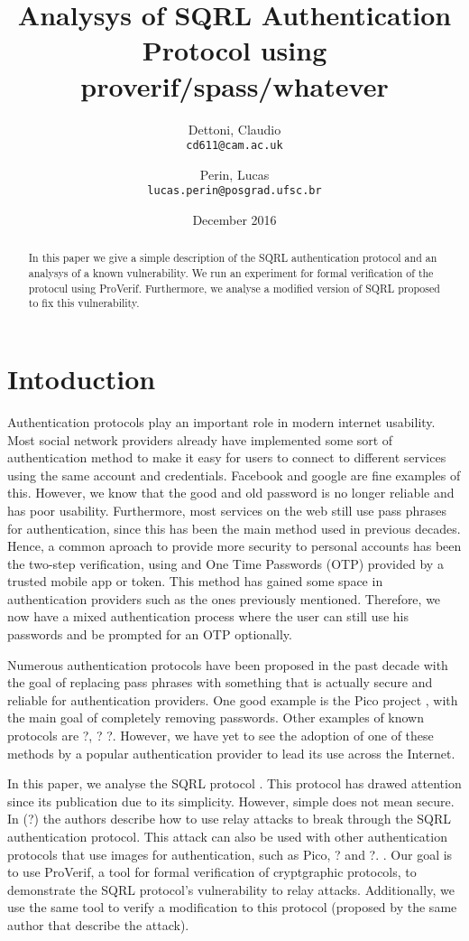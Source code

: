 \documentclass{article}
\title{Analysys of SQRL Authentication Protocol using proverif/spass/whatever}
\author{Dettoni, Claudio\\
	\texttt{cd611@cam.ac.uk}
	\and
	Perin, Lucas\\
	\texttt{lucas.perin@posgrad.ufsc.br}
}
\date{December 2016}
\begin{document}
\maketitle

\begin{abstract}
	In this paper we give a simple description of the SQRL authentication
	protocol and an analysys of a known vulnerability. We run an 
	experiment for formal verification of the protocul using ProVerif.
	Furthermore, we analyse a modified version of SQRL proposed to fix
	this vulnerability.
\end{abstract}

\section{Intoduction}
	Authentication protocols play an important role in modern internet
	usability. Most social network providers already have implemented
	some sort of authentication method to make it easy for users to connect
	to different services using the same account and credentials. Facebook 
	and google are fine examples of this. However, we know that the good and 
	old password is no longer reliable and has poor usability. 
	Furthermore, most services on the web still use pass phrases for authentication,
	since this has been the main method used in previous decades. Hence,
	a common aproach to provide more security to personal accounts has 
	been the two-step verification, using and One Time Passwords (OTP) 
	provided by a trusted mobile app or token. This	method has gained some 
	space in authentication providers such as the
	ones previously mentioned. Therefore, we now have a mixed authentication process
	where the user can still use his passwords and be prompted for an
	OTP optionally.

	Numerous authentication protocols have been proposed in the past
	decade with the goal of replacing pass phrases with something that
	is actually secure and reliable for authentication providers. One
	good example is the Pico project , with the main goal of
	completely removing passwords. Other examples of known protocols are ?, ? ?.  
	However, we have yet to see the adoption of one of these methods
	by a popular authentication provider to lead its use across the
	Internet. 

	In this paper, we analyse the SQRL protocol . This protocol
	has drawed attention since its publication due to its simplicity. However,
	simple does not mean secure. In (?) the authors
	describe how to use relay attacks to break through the SQRL authentication
	protocol. This attack can also be used with other authentication
	protocols that use images for authentication, such as Pico, ? and ?. .
	Our goal is to use ProVerif, a tool for formal verification of cryptgraphic
	protocols, to demonstrate the SQRL protocol's vulnerability to relay attacks.
	Additionally, we use the same tool to verify a modification to this protocol 
	(proposed by the same author that describe the attack). 
\end{document}
